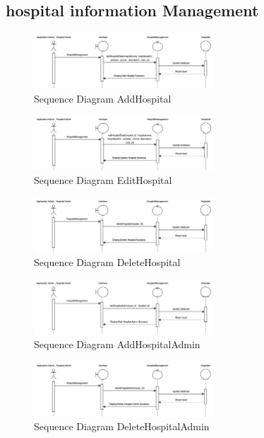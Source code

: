 \subsection{hospital information Management}

\begin{figure}[h]
    \centering
    \includegraphics[width=0.6\textwidth]{Sequence 9.1.png}
    \caption{Sequence Diagram AddHospital}
    \end{figure}

    \begin{figure}[h]
    \centering
    \includegraphics[width=0.6\textwidth]{Sequence 9.2.png}
    \caption{Sequence Diagram EditHospital}
    \end{figure}

    \begin{figure}[h]
    \centering
    \includegraphics[width=0.6\textwidth]{Sequence 9.3.png}
    \caption{Sequence Diagram DeleteHospital}
    \end{figure}

    \begin{figure}[h]
    \centering
    \includegraphics[width=0.6\textwidth]{Sequence 9.4.png}
    \caption{Sequence Diagram AddHospitalAdmin}
    \end{figure}

    \begin{figure}[h]
    \centering
    \includegraphics[width=0.6\textwidth]{Sequence 9.5.png}
    \caption{Sequence Diagram DeleteHospitalAdmin}
    \end{figure}

